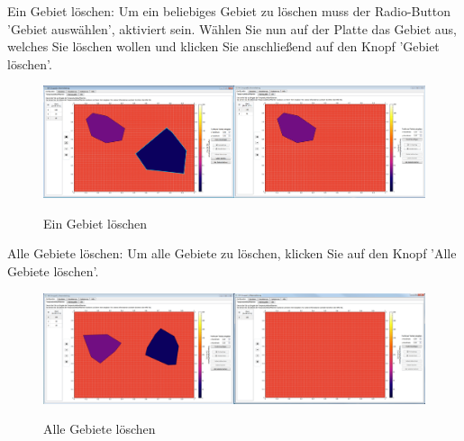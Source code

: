 \noindent
Ein Gebiet löschen: Um ein beliebiges Gebiet zu löschen muss der Radio-Button 'Gebiet auswählen', aktiviert sein. Wählen Sie nun auf der Platte das Gebiet aus, welches Sie löschen wollen und klicken Sie anschließend auf den Knopf 'Gebiet löschen'.
\begin{figure}[H]
\centering
\includegraphics[scale=.25]{Bilder/GebietLoeschen.png}\\
\caption{Ein Gebiet löschen}
\label{GebietLoeschen}
\end{figure}

\newpage
\noindent
Alle Gebiete löschen: Um alle Gebiete zu löschen, klicken Sie auf den Knopf 'Alle Gebiete löschen'.
\begin{figure}[H]
\centering
\includegraphics[scale=.25]{Bilder/AlleGebieteLoeschen.png}\\
\caption{Alle Gebiete löschen}
\label{AlleGebieteLoeschen}
\end{figure}

